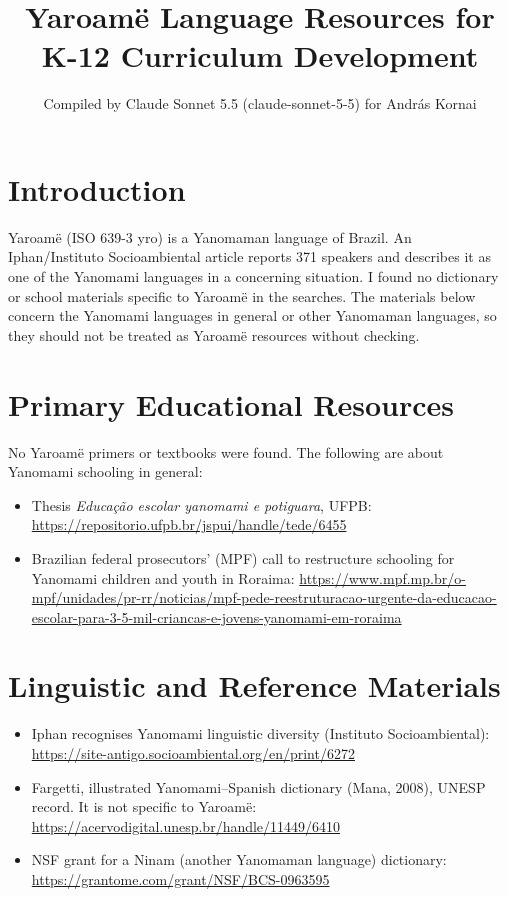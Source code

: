 \documentclass[12pt]{article}
\title{Yaroam\"e Language Resources for K-12 Curriculum Development}
\author{Compiled by Claude Sonnet 5.5 (claude-sonnet-5-5) for Andr\'as Kornai}
\date{}
\begin{document}
\maketitle

\section{Introduction}
Yaroam\"e (ISO 639-3 yro) is a Yanomaman language of Brazil. An Iphan/Instituto Socioambiental article reports 371 speakers and describes it as one of the Yanomami languages in a concerning situation. I found no dictionary or school materials specific to Yaroam\"e in the searches. The materials below concern the Yanomami languages in general or other Yanomaman languages, so they should not be treated as Yaroam\"e resources without checking.

\section{Primary Educational Resources}
No Yaroam\"e primers or textbooks were found. The following are about Yanomami schooling in general:
\begin{itemize}
\item Thesis \emph{Educa\c{c}\~ao escolar yanomami e potiguara}, UFPB: \url{https://repositorio.ufpb.br/jspui/handle/tede/6455}
\item Brazilian federal prosecutors' (MPF) call to restructure schooling for Yanomami children and youth in Roraima: \url{https://www.mpf.mp.br/o-mpf/unidades/pr-rr/noticias/mpf-pede-reestruturacao-urgente-da-educacao-escolar-para-3-5-mil-criancas-e-jovens-yanomami-em-roraima}
\end{itemize}

\section{Linguistic and Reference Materials}
\begin{itemize}
\item Iphan recognises Yanomami linguistic diversity (Instituto Socioambiental): \url{https://site-antigo.socioambiental.org/en/print/6272}
\item Fargetti, illustrated Yanomami--Spanish dictionary (Mana, 2008), UNESP record. It is not specific to Yaroam\"e: \url{https://acervodigital.unesp.br/handle/11449/6410}
\item NSF grant for a Ninam (another Yanomaman language) dictionary: \url{https://grantome.com/grant/NSF/BCS-0963595}
\end{itemize}
\end{document}
